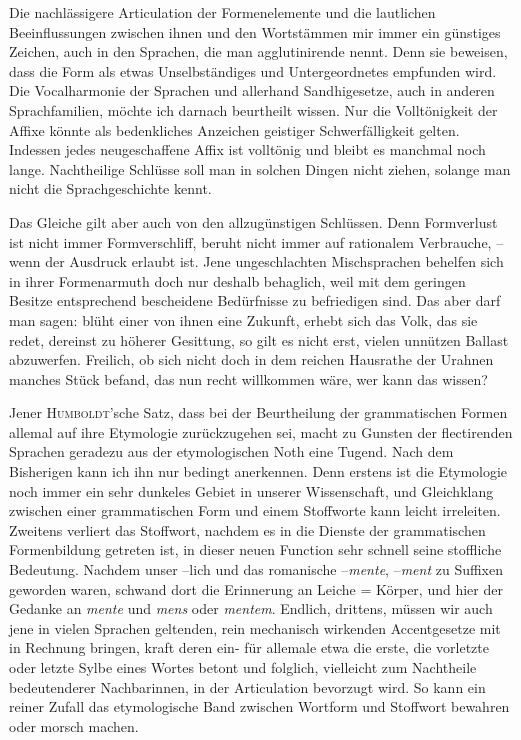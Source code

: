 Die nachlässigere Articulation der Formenelemente und die lautlichen Beeinflussungen zwischen ihnen und den Wortstämmen  mir immer ein günstiges Zeichen, auch in den Sprachen, die man agglutinirende nennt. Denn sie beweisen, dass die Form als etwas Unselbstän\label{fp.416}diges und Untergeordnetes empfunden wird. Die Vocalharmonie der  Sprachen und allerhand Sandhigesetze, auch in anderen Sprachfamilien, möchte ich darnach beurtheilt wissen. Nur die Volltönigkeit der Affixe könnte als bedenkliches Anzeichen geistiger Schwerfälligkeit gelten. Indessen jedes neugeschaffene Affix ist volltönig und bleibt es manchmal noch lange. Nachtheilige Schlüsse soll man in solchen Dingen nicht ziehen, solange man nicht die Sprachgeschichte kennt.

\label{sp.437}

Das Gleiche gilt aber auch von den allzugünstigen Schlüssen. Denn Formverlust ist nicht immer Formverschliff, beruht nicht immer auf rationalem Verbrauche, – wenn der Ausdruck erlaubt ist. Jene ungeschlachten Mischsprachen behelfen sich in ihrer Formenarmuth doch nur deshalb behaglich, weil mit dem geringen Besitze entsprechend bescheidene Bedürfnisse zu befriedigen sind. Das aber darf man sagen: blüht einer von ihnen eine Zukunft, erhebt sich das Volk, das sie redet, dereinst zu höherer Gesittung, so gilt es nicht erst, vielen unnützen Ballast abzuwerfen. Freilich, ob sich nicht doch in dem reichen Hausrathe der Urahnen manches Stück befand, das nun recht willkommen wäre, wer kann das wissen?

\largerpage
\begin{sloppypar}Jener \textsc{Humboldt}’sche Satz, dass bei der Beurtheilung der grammatischen Formen allemal auf ihre Etymologie zurückzugehen sei, macht zu Gunsten der flectirenden Sprachen geradezu aus der etymologischen Noth eine Tugend. Nach dem Bisherigen kann ich ihn nur bedingt anerkennen. Denn erstens ist die Etymologie noch immer ein sehr dunkeles Gebiet in unserer Wissenschaft, und Gleichklang zwischen einer grammatischen Form und einem Stoffworte kann leicht irreleiten. Zweitens verliert das Stoffwort, nachdem es in die Dienste der grammatischen Formenbildung getreten ist, in dieser neuen Function sehr schnell seine stoffliche Bedeutung. Nachdem unser –lich und das romanische –\textit{mente}, –\textit{ment} zu Suffixen geworden waren, schwand dort die Erinnerung an Leiche = Körper, und hier der Gedanke an \textit{mente} und \textit{mens} oder \textit{mentem}. Endlich, drittens, müssen wir auch jene in vielen Sprachen geltenden, rein mechanisch wirkenden Accentgesetze mit in Rechnung bringen, kraft deren ein- für allemale etwa die erste, die vorletzte oder letzte Sylbe eines Wortes betont und folglich, vielleicht zum Nachtheile bedeutenderer Nachbarinnen, in der Articulation bevorzugt wird. So kann ein reiner Zufall das etymologische Band zwischen Wortform und Stoffwort bewahren oder morsch machen.\end{sloppypar}

